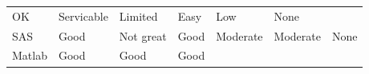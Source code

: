 \documentclass[]{book}
\begin{document}
\begin{longtable}[]{@{}lllllll@{}}
\begin{minipage}[t]{0.10\columnwidth}
OK\strut
\end{minipage} & \begin{minipage}[t]{0.13\columnwidth}\raggedright
Servicable\strut
\end{minipage} & \begin{minipage}[t]{0.16\columnwidth}\raggedright
Limited\strut
\end{minipage} & \begin{minipage}[t]{0.11\columnwidth}\raggedright
Easy\strut
\end{minipage} & \begin{minipage}[t]{0.17\columnwidth}\raggedright
Low\strut
\end{minipage} & \begin{minipage}[t]{0.05\columnwidth}\raggedright
None\strut
\end{minipage}\tabularnewline
\begin{minipage}[t]{0.08\columnwidth}\raggedright
SAS\strut
\end{minipage} & \begin{minipage}[t]{0.10\columnwidth}\raggedright
Good\strut
\end{minipage} & \begin{minipage}[t]{0.13\columnwidth}\raggedright
Not great\strut
\end{minipage} & \begin{minipage}[t]{0.16\columnwidth}\raggedright
Good\strut
\end{minipage} & \begin{minipage}[t]{0.11\columnwidth}\raggedright
Moderate\strut
\end{minipage} & \begin{minipage}[t]{0.17\columnwidth}\raggedright
Moderate\strut
\end{minipage} & \begin{minipage}[t]{0.05\columnwidth}\raggedright
None\strut
\end{minipage}\tabularnewline
\begin{minipage}[t]{0.08\columnwidth}\raggedright
Matlab\strut
\end{minipage} & \begin{minipage}[t]{0.10\columnwidth}\raggedright
Good\strut
\end{minipage} & \begin{minipage}[t]{0.13\columnwidth}\raggedright
Good\strut
\end{minipage} & \begin{minipage}[t]{0.16\columnwidth}\raggedright
Good\strut
\end{minipage} & \begin{minipage}[t]{0.11\columnwidth}\raggedright

\end{minipage}
\end{longtable}
\end{document}
